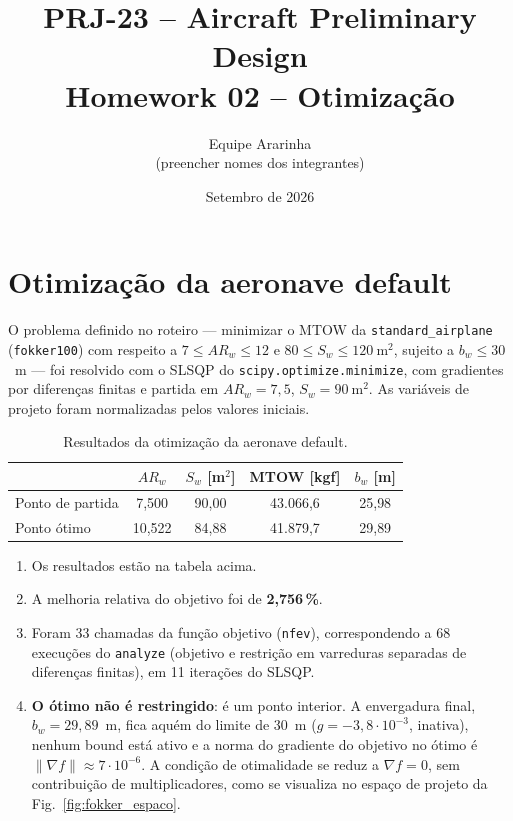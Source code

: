 \documentclass[11pt,a4paper]{article}
\title{PRJ-23 -- Aircraft Preliminary Design\\
       \Large Homework 02 -- Otimização}
\author{Equipe Ararinha\\ \small (preencher nomes dos integrantes)}
\date{Setembro de 2026}
\begin{document}
\maketitle

\section{Otimização da aeronave default}

O problema definido no roteiro --- minimizar o MTOW da \texttt{standard\_airplane}
(\texttt{fokker100}) com respeito a $7 \le AR_w \le 12$ e
$80 \le S_w \le 120~\mathrm{m^2}$, sujeito a $b_w \le 30$~m --- foi resolvido
com o SLSQP do \texttt{scipy.optimize.minimize}, com gradientes por diferenças
finitas e partida em $AR_w = 7{,}5$, $S_w = 90~\mathrm{m^2}$. As variáveis de
projeto foram normalizadas pelos valores iniciais.

\begin{table}[H]
\centering
\caption{Resultados da otimização da aeronave default.}
\begin{tabular}{lcccc}
\toprule
 & $AR_w$ & $S_w$ [m$^2$] & MTOW [kgf] & $b_w$ [m] \\
\midrule
Ponto de partida & 7{,}500  & 90{,}00 & 43.066{,}6 & 25{,}98 \\
Ponto ótimo      & 10{,}522 & 84{,}88 & 41.879{,}7 & 29{,}89 \\
\bottomrule
\end{tabular}
\end{table}

\begin{enumerate}
\item Os resultados estão na tabela acima.
\item A melhoria relativa do objetivo foi de \textbf{2{,}756\,\%}.
\item Foram 33 chamadas da função objetivo (\texttt{nfev}), correspondendo a
      68 execuções do \texttt{analyze} (objetivo e restrição em varreduras
      separadas de diferenças finitas), em 11 iterações do SLSQP.
\item \textbf{O ótimo não é restringido}: é um ponto interior. A envergadura
      final, $b_w = 29{,}89$~m, fica aquém do limite de 30~m
      ($g = -3{,}8\cdot10^{-3}$, inativa), nenhum bound está ativo e a norma
      do gradiente do objetivo no ótimo é $\|\nabla f\| \approx 7\cdot10^{-6}$.
      A condição de otimalidade se reduz a $\nabla f = 0$, sem contribuição de
      multiplicadores, como se visualiza no espaço de projeto da
      Fig.~\ref{fig:fokker_espaco}.
\end{enumerate}
\end{document}

